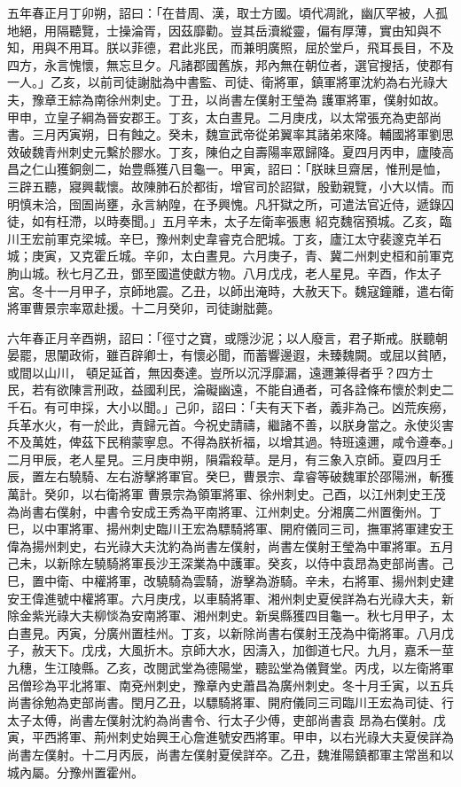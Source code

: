 \begin{pinyinscope}
 五年春正月丁卯朔，詔曰：「在昔周、漢，取士方國。頃代凋訛，幽仄罕被，人孤地絕，用隔聽覽，士操淪胥，因茲靡勸。豈其岳瀆縱靈，偏有厚薄，實由知與不知，用與不用耳。朕以菲德，君此兆民，而兼明廣照，屈於堂戶，飛耳長目，不及四方，永言愧懷，無忘旦夕。凡諸郡國舊族，邦內無在朝位者，選官搜括，使郡有一人。」乙亥，以前司徒謝朏為中書監、司徒、衛將軍，鎮軍將軍沈約為右光祿大夫，豫章王綜為南徐州刺史。丁丑，以尚書左僕射王瑩為
 護軍將軍，僕射如故。甲申，立皇子綱為晉安郡王。丁亥，太白晝見。二月庚戌，以太常張充為吏部尚書。三月丙寅朔，日有蝕之。癸未，魏宣武帝從弟翼率其諸弟來降。輔國將軍劉思效破魏青州刺史元繫於膠水。丁亥，陳伯之自壽陽率眾歸降。夏四月丙申，廬陵高昌之仁山獲銅劍二，始豊縣獲八目龜一。甲寅，詔曰：「朕昧旦齋居，惟刑是恤，三辟五聽，寢興載懷。故陳肺石於都街，增官司於詔獄，殷勤親覽，小大以情。而明慎未洽，囹圄尚壅，永言納隍，在予興愧。凡犴獄之所，可遣法官近侍，遞錄囚徒，如有枉滯，以時奏聞。」五月辛未，太子左衛率張惠
 紹克魏宿預城。乙亥，臨川王宏前軍克梁城。辛巳，豫州刺史韋睿克合肥城。丁亥，廬江太守裴邃克羊石城；庚寅，又克霍丘城。辛卯，太白晝見。六月庚子，青、冀二州刺史桓和前軍克朐山城。秋七月乙丑，鄧至國遣使獻方物。八月戊戌，老人星見。辛酉，作太子宮。冬十一月甲子，京師地震。乙丑，以師出淹時，大赦天下。魏寇鐘離，遣右衛將軍曹景宗率眾赴援。十二月癸卯，司徒謝朏薨。



 六年春正月辛酉朔，詔曰：「徑寸之寶，或隱沙泥；以人廢言，君子斯戒。朕聽朝晏罷，思闡政術，雖百辟卿士，有懷必聞，而蓄響邊遐，未臻魏闕。或屈以貧陋，或間以山川，
 頓足延首，無因奏達。豈所以沉浮靡漏，遠邇兼得者乎？四方士民，若有欲陳言刑政，益國利民，淪礙幽遠，不能自通者，可各詮條布懷於刺史二千石。有可申採，大小以聞。」己卯，詔曰：「夫有天下者，義非為己。凶荒疾癆，兵革水火，有一於此，責歸元首。今祝史請禱，繼諸不善，以朕身當之。永使災害不及萬姓，俾茲下民稍蒙寧息。不得為朕祈福，以增其過。特班遠邇，咸令遵奉。」二月甲辰，老人星見。三月庚申朔，隕霜殺草。是月，有三象入京師。夏四月壬辰，置左右驍騎、左右游擊將軍官。癸巳，曹景宗、韋睿等破魏軍於邵陽洲，斬獲萬計。癸卯，以右衛將軍
 曹景宗為領軍將軍、徐州刺史。己酉，以江州刺史王茂為尚書右僕射，中書令安成王秀為平南將軍、江州刺史。分湘廣二州置衡州。丁巳，以中軍將軍、揚州刺史臨川王宏為驃騎將軍、開府儀同三司，撫軍將軍建安王偉為揚州刺史，右光祿大夫沈約為尚書左僕射，尚書左僕射王瑩為中軍將軍。五月己未，以新除左驍騎將軍長沙王深業為中護軍。癸亥，以侍中袁昂為吏部尚書。己巳，置中衛、中權將軍，改驍騎為雲騎，游擊為游騎。辛未，右將軍、揚州刺史建安王偉進號中權將軍。六月庚戌，以車騎將軍、湘州刺史夏侯詳為右光祿大夫，新
 除金紫光祿大夫柳惔為安南將軍、湘州刺史。新吳縣獲四目龜一。秋七月甲子，太白晝見。丙寅，分廣州置桂州。丁亥，以新除尚書右僕射王茂為中衛將軍。八月戊子，赦天下。戊戌，大風折木。京師大水，因濤入，加御道七尺。九月，嘉禾一莖九穗，生江陵縣。乙亥，改閱武堂為德陽堂，聽訟堂為儀賢堂。丙戌，以左衛將軍呂僧珍為平北將軍、南兗州刺史，豫章內史蕭昌為廣州刺史。冬十月壬寅，以五兵尚書徐勉為吏部尚書。閏月乙丑，以驃騎將軍、開府儀同三司臨川王宏為司徒、行太子太傅，尚書左僕射沈約為尚書令、行太子少傅，吏部尚書袁
 昂為右僕射。戊寅，平西將軍、荊州刺史始興王心詹進號安西將軍。甲申，以右光祿大夫夏侯詳為尚書左僕射。十二月丙辰，尚書左僕射夏侯詳卒。乙丑，魏淮陽鎮都軍主常邕和以城內屬。分豫州置霍州。




\end{pinyinscope}
